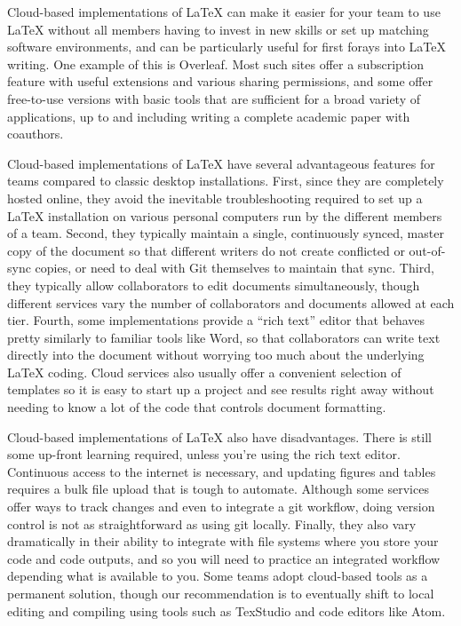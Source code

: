 Cloud-based implementations of {\LaTeX} can make it easier for your team to use
{\LaTeX} without all members having to invest in new skills
or set up matching software environments,
and can be particularly useful for first forays into {\LaTeX} writing.
One example of this is Overleaf.
Most such sites offer a subscription feature
with useful extensions and various sharing permissions,
and some offer free-to-use versions with basic tools that are sufficient
for a broad variety of applications,
up to and including writing a complete academic paper with coauthors.

Cloud-based implementations of {\LaTeX} have several advantageous features
for teams compared to classic desktop installations.
First, since they are completely hosted online,
they avoid the inevitable troubleshooting required to set up a {\LaTeX} installation
on various personal computers run by the different members of a team.
Second, they typically maintain a single, continuously synced, master copy of the document
so that different writers do not create conflicted or out-of-sync copies,
or need to deal with Git themselves to maintain that sync.
Third, they typically allow collaborators to edit documents simultaneously,
though different services vary the number of collaborators and documents allowed at each tier.
Fourth, some implementations provide a ``rich text'' editor
that behaves pretty similarly to familiar tools like Word,
so that collaborators can write text directly into the document without worrying too much
about the underlying {\LaTeX} coding.
Cloud services also usually offer a convenient selection of templates
so it is easy to start up a project and see results right away
without needing to know a lot of the code that controls document formatting.

Cloud-based implementations of {\LaTeX} also have disadvantages.
There is still some up-front learning required, unless you're using the rich text editor.
Continuous access to the internet is necessary,
and updating figures and tables requires a bulk file upload that is tough to automate.
Although some services offer ways to track changes and even to integrate a git workflow,
doing version control is not as straightforward as using git locally.
Finally, they also vary dramatically in their ability to integrate
with file systems where you store your code and code outputs,
and so you will need to practice an integrated workflow depending what is available to you.
Some teams adopt cloud-based tools as a permanent solution,
though our recommendation is to eventually shift to
local editing and compiling using tools such as TexStudio and code editors like Atom.

